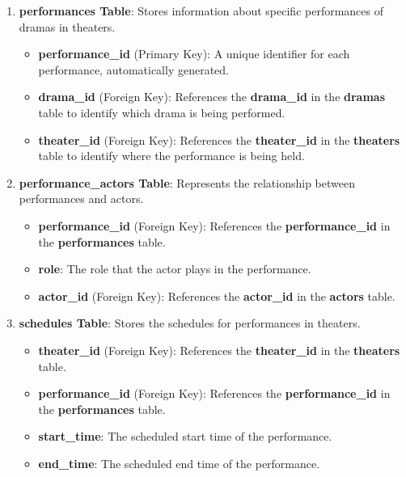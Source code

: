 \documentclass[12pt]{article}
\begin{document}
\begin{enumerate}
    \item \textbf{performances Table}: Stores information about specific performances of dramas in theaters. 
    \begin{itemize}
        \item \textbf{performance\_id} (Primary Key): A unique identifier for each performance, automatically generated.
        \item \textbf{drama\_id} (Foreign Key): References the \textbf{drama\_id} in the \textbf{dramas} table to identify which drama is being performed.
        \item \textbf{theater\_id} (Foreign Key): References the \textbf{theater\_id} in the \textbf{theaters} table to identify where the performance is being held.
    \end{itemize}

    \item \textbf{performance\_actors Table}: Represents the relationship between performances and actors. 
    \begin{itemize}
        \item \textbf{performance\_id} (Foreign Key): References the \textbf{performance\_id} in the \textbf{performances} table.
        \item \textbf{role}: The role that the actor plays in the performance.
        \item \textbf{actor\_id} (Foreign Key): References the \textbf{actor\_id} in the \textbf{actors} table.
    \end{itemize}

    \item \textbf{schedules Table}: Stores the schedules for performances in theaters. 
    \begin{itemize}
        \item \textbf{theater\_id} (Foreign Key): References the \textbf{theater\_id} in the \textbf{theaters} table.
        \item \textbf{performance\_id} (Foreign Key): References the \textbf{performance\_id} in the \textbf{performances} table.
        \item \textbf{start\_time}: The scheduled start time of the performance.
        \item \textbf{end\_time}: The scheduled end time of the performance. 
    \end{itemize}


\end{enumerate}
\end{document}
